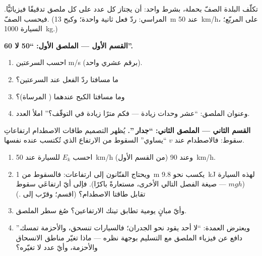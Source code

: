 \begin{problem}\label{pb:g9:kinetic-energy-safety:1}
تكلّف البلدة الصفّ بحملة، بشرط واحد: أن يجتاز كل عدد على كل
ملصق تدقيقًا فيزيائيًّا. فيحسب الصفّ. (المراسي: ردّ فعل ثانية
واحدة؛ وكبح \qty{13}{m} عند \qty{50}{km/h}،  على
المربّع؛  السيارة \qty{1000}{kg}.)

\medskip\noindent\textbf{القسم الأول --- الملصق الأول: ``50 لا
60''.}
\begin{enumerate}
  \item احسب السرعتين  \unit{m/s} (برقم عشري واحد).
  \item ما مسافتا ردّ الفعل عند السرعتين؟
  \item وما مسافتا الكبح عندهما ( المرساة)؟
  \item وعنوان الملصق: ``عشر وحدات  زيادة --- فكم مترًا
        زيادة في التوقّف؟'' املأ العدد.
\end{enumerate}

\medskip\noindent\textbf{القسم الثاني --- الملصق الثاني:
``جدار ''.}
يُظهر التصميم طاقات الاصطدام ارتفاعاتِ سقوط: فالاصطدام عند
 $v$ ``يساوي'' السقوط من الارتفاع الذي تُكتسب عنده 
نفسها.
\begin{enumerate}[resume]
  \item احسب $E_k$ للسيارة عند \qty{50}{km/h} (من القسم
        الأول) وعند \qty{90}{km/h}.
  \item ويحتاج الفنّانون إلى ارتفاعات: فالسقوط من \qty{1}{m}
        يكسب نحو \qty{9.8}{kJ} لهذه السيارة ($m g h$ ---
        صيغة الفصل التالي الأخرى، مستعارةً باكرًا). فإلى أيّ
        ارتفاعَي سقوط تقابل طاقتا الاصطدام؟ (اقسم؛ وقرّب إلى
        .)
  \item وأيّ مبانٍ يومية تطابق تينك الارتفاعين؟ صُغ سطر
        الملصق.
  \item ويعترض العمدة: ``لا أحد يقود نحو الجدران؛ فالسيارات
        تنسحق، والأحزمة تمسك.'' دافع عن فيزياء الملصق مع
        التسليم بوجهة نظره --- ماذا تغيّر مناطق الانسحاق
        والأحزمة، وأيّ عدد لا تغيّره؟
\end{enumerate}


\end{problem}
